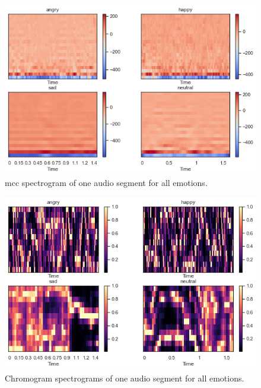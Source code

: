 \begin{figure}[H]
	\centering
	\includegraphics[width=\linewidth]{figs/appendix/feature_selection/mfccSpec.png}
	\caption{\ac{mcc} spectrogram of one audio segment for all emotions.}
	\label{fig:mfccSpec}
\end{figure}


\begin{figure}[H]
	\centering
	\includegraphics[width=\linewidth]{figs/appendix/feature_selection/ChromSpec.png}
	\caption{Chromogram spectrograms of one audio segment for all emotions.}
	\label{fig:ChromSpec}
\end{figure}

